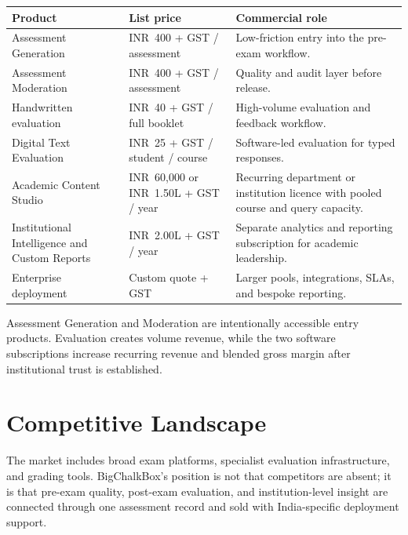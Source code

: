\documentclass[11pt,a4paper]{article}
\newcommand{\rs}{INR}
\begin{document}
\begin{tabularx}{\textwidth}{L{0.29\textwidth}L{0.24\textwidth}Y}
\toprule
\textbf{Product} & \textbf{List price} & \textbf{Commercial role} \\
\midrule
Assessment Generation & \rs\ 400 + GST / assessment & Low-friction entry into the pre-exam workflow. \\
Assessment Moderation & \rs\ 400 + GST / assessment & Quality and audit layer before release. \\
Handwritten evaluation & \rs\ 40 + GST / full booklet & High-volume evaluation and feedback workflow. \\
Digital Text Evaluation & \rs\ 25 + GST / student / course & Software-led evaluation for typed responses. \\
Academic Content Studio & \rs\ 60,000 or \rs\ 1.50L + GST / year & Recurring department or institution licence with pooled course and query capacity. \\
Institutional Intelligence and Custom Reports & \rs\ 2.00L + GST / year & Separate analytics and reporting subscription for academic leadership. \\
Enterprise deployment & Custom quote + GST & Larger pools, integrations, SLAs, and bespoke reporting. \\
\bottomrule
\end{tabularx}

Assessment Generation and Moderation are intentionally accessible entry products. Evaluation creates volume revenue, while the two software subscriptions increase recurring revenue and blended gross margin after institutional trust is established.

\section{Competitive Landscape}

The market includes broad exam platforms, specialist evaluation infrastructure, and grading tools. BigChalkBox's position is not that competitors are absent; it is that pre-exam quality, post-exam evaluation, and institution-level insight are connected through one assessment record and sold with India-specific deployment support.
\end{document}
